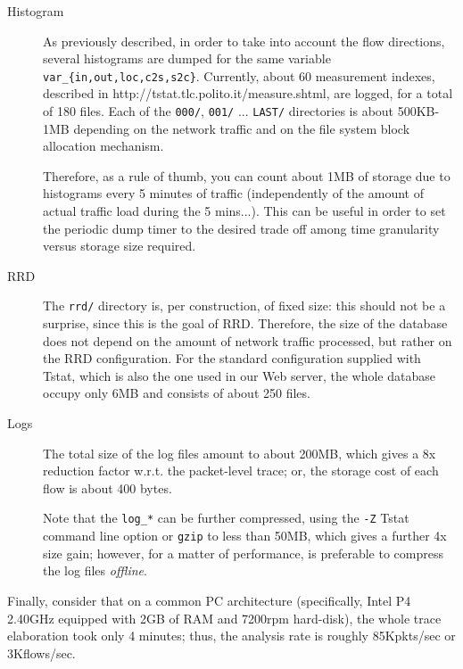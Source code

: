\documentclass[11pt]{article}
\begin{document}
\begin{description}

\item[{Histogram}] \mbox{}

As previously described, in order to take into account the flow directions,
several histograms are dumped for the same variable \texttt{var\_\{in,out,loc,c2s,s2c\}}.
Currently, about 60 measurement indexes, described in 
\textsf{http://tstat.tlc.polito.it/measure.shtml},  are logged, for a total
of 180 files. Each of the \texttt{000/}, \texttt{001/} ... \texttt{LAST/} directories is about
500KB-1MB depending on the network traffic and on the file system block
allocation mechanism.



Therefore,  as a rule of thumb, you can count about 1MB of storage due to
histograms every 5 minutes of traffic (independently of the amount of actual
traffic load during the 5 mins...). This can be useful in order to set the
periodic dump timer to the desired trade off among time granularity versus
storage size  required.


\item[{RRD}] \mbox{}

The \texttt{rrd/} directory is, per construction, of fixed size: this should not be a
surprise, since this is the goal of RRD. Therefore, the size of the database
does not depend on the amount of network traffic processed, but rather on the
RRD configuration. For the standard configuration supplied with Tstat, which is
also the one used in our Web server, the whole database occupy only 6MB and
consists of about 250 files.


\item[{Logs}] \mbox{}

The total size of the log files amount to about 200MB, which 
gives  a 8x reduction factor w.r.t. the packet-level trace; or,
the storage cost of each flow is about 400 bytes.



Note that the \texttt{log\_*} can be further compressed, using the \texttt{-Z} Tstat
command line option or \texttt{gzip} to less than 50MB, which gives a further 
4x size gain; however, for a matter of performance, is preferable 
to compress the log files \textit{offline}.

\end{description}


Finally, consider that on a common PC architecture (specifically,
Intel P4 2.40GHz equipped with 2GB of RAM and 7200rpm hard-disk),
the whole trace elaboration took only 4 minutes; thus, the 
analysis rate is roughly 85Kpkts/sec or 3Kflows/sec.
\end{document}
